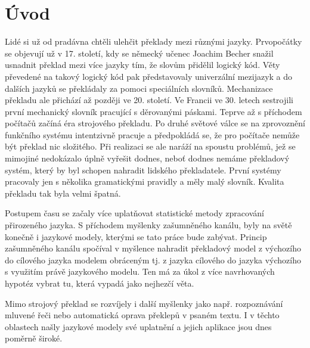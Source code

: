 \documentclass[12pt,a4paper]{report}
\let\openright=\clearpage
\def\chapwithtoc#1{
\chapter*{#1}
\addcontentsline{toc}{chapter}{#1}
}
\begin{document}
\newpage


\openright
\pagestyle{plain}
\tableofcontents

%
%
%


\captionsetup[figure]{aboveskip=0pt, parskip=0pt}


\chapwithtoc{Úvod}
Lidé si už od pradávna chtěli ulehčit překlady mezi různými jazyky. Prvopočátky se objevují už v 17. století, kdy se německý učenec Joachim Becher snažil usnadnit překlad mezi více jazyky tím, že slovům přidělil logický kód. Věty převedené na takový logický kód pak představovaly univerzální mezijazyk a do dalších jazyků se překládaly za pomoci speciálních slovníků. Mechanizace překladu ale přichází až později ve 20. století. Ve Francii ve 30. letech sestrojili první mechanický slovník pracující s děrovanými páskami. Teprve až s příchodem počítačů začíná éra strojového překladu. Po druhé světové válce se na zprovoznění funkčního systému intentzivně pracuje a předpokládá se, že pro počítače nemůže být překlad nic složitého. Při realizaci se ale naráží na spoustu problémů, jež se mimojiné nedokázalo úplně vyřešit dodnes, neboť dodnes nemáme překladový systém, který by byl schopen nahradit lidského překladatele. První systémy pracovaly jen s několika gramatickými pravidly a měly malý slovník. Kvalita překladu tak byla velmi špatná.

Postupem času se začaly více uplatňovat statistické metody zpracování přirozeného jazyka. S příchodem myšlenky zašumněného kanálu, byly na světě konečně i jazykové modely, kterými se tato práce bude zabývat. Princip zašumněného kanálu spočíval v myšlence nahradit překladový model z výchozího do cílového jazyka modelem obráceným tj. z jazyka cílového do jazyka výchozího s využitím právě jazykového modelu. Ten má za úkol z více navrhovaných hypotéz vybrat tu, která vypadá jako nejhezčí věta.

Mimo strojový překlad se rozvíjely i další myšlenky jako např. rozpoznávání mluvené řeči nebo automatická oprava překlepů v psaném textu. I v těchto oblastech našly jazykové modely své uplatnění a jejich aplikace jsou dnes poměrně široké.
\end{document}
